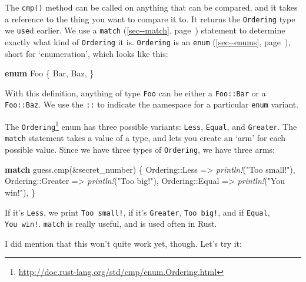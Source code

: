 \documentclass[a4paper,]{book}
\renewcommand*{\hyperref}[2][\ar]{%
  \def\ar{#2}%
  #2 (\autoref{#1}, page~\pageref{#1})}
\newenvironment{Shaded}{\begin{snugshade}}{\end{snugshade}}
\newcommand{\KeywordTok}[1]{\textcolor[rgb]{0.13,0.29,0.53}{\textbf{{#1}}}}
\newcommand{\StringTok}[1]{\textcolor[rgb]{0.31,0.60,0.02}{{#1}}}
\newcommand{\PreprocessorTok}[1]{\textcolor[rgb]{0.56,0.35,0.01}{\textit{{#1}}}}
\newcommand{\NormalTok}[1]{{#1}}
\renewcommand{\href}[2]{#2\footnote{\url{#1}}}
\begin{document}
The \texttt{cmp()} method can be called on anything that can be
compared, and it takes a reference to the thing you want to compare it
to. It returns the \texttt{Ordering} type we \texttt{use}d earlier. We
use a \hyperref[sec--match]{\texttt{match}} statement to determine
exactly what kind of \texttt{Ordering} it is. \texttt{Ordering} is an
\hyperref[sec--enums]{\texttt{enum}}, short for `enumeration', which
looks like this:

\begin{Shaded}
\begin{Highlighting}[]
\KeywordTok{enum} \NormalTok{Foo \{}
    \NormalTok{Bar,}
    \NormalTok{Baz,}
\NormalTok{\}}
\end{Highlighting}
\end{Shaded}

With this definition, anything of type \texttt{Foo} can be either a
\texttt{Foo::Bar} or a \texttt{Foo::Baz}. We use the \texttt{::} to
indicate the namespace for a particular \texttt{enum} variant.

The
\href{http://doc.rust-lang.org/std/cmp/enum.Ordering.html}{\texttt{Ordering}}
enum has three possible variants: \texttt{Less}, \texttt{Equal}, and
\texttt{Greater}. The \texttt{match} statement takes a value of a type,
and lets you create an `arm' for each possible value. Since we have
three types of \texttt{Ordering}, we have three arms:

\begin{Shaded}
\begin{Highlighting}[]
\KeywordTok{match} \NormalTok{guess.cmp(&secret_number) \{}
    \NormalTok{Ordering::Less    => }\PreprocessorTok{println!}\NormalTok{(}\StringTok{"Too small!"}\NormalTok{),}
    \NormalTok{Ordering::Greater => }\PreprocessorTok{println!}\NormalTok{(}\StringTok{"Too big!"}\NormalTok{),}
    \NormalTok{Ordering::Equal   => }\PreprocessorTok{println!}\NormalTok{(}\StringTok{"You win!"}\NormalTok{),}
\NormalTok{\}}
\end{Highlighting}
\end{Shaded}

If it's \texttt{Less}, we print \texttt{Too\ small!}, if it's
\texttt{Greater}, \texttt{Too\ big!}, and if \texttt{Equal},
\texttt{You\ win!}. \texttt{match} is really useful, and is used often
in Rust.

I did mention that this won't quite work yet, though. Let's try it:
\end{document}
